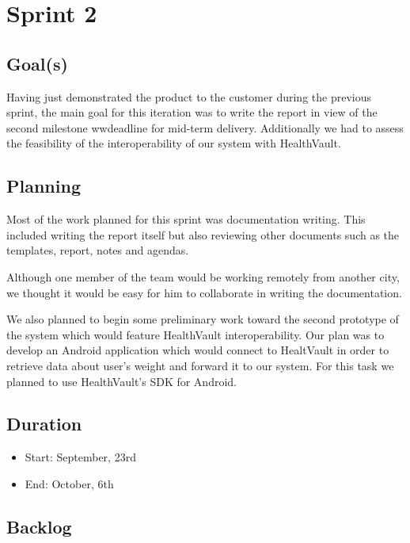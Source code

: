 

\chapter{Sprint 2}
\label{Sprint0}

\section{Goal(s)}
Having just demonstrated the product to the customer during the previous sprint, the main goal
for this iteration was to write the report in view of the second milestone wwdeadline for mid-term delivery.
Additionally we had to assess the feasibility of the interoperability of our system with HealthVault.


\section{Planning}
Most of the work planned for this sprint was documentation writing.
This included writing the report itself but also reviewing other documents such as the
templates, report, notes and agendas.

Although one member of the team would be working remotely from another city,
we thought it would be easy for him to collaborate in writing the documentation.

We also planned to begin some preliminary work toward the second prototype of the system which would
feature HealthVault interoperability. Our plan was to develop an Android application which would connect
to HealtVault in order to retrieve data about user's weight and forward it to our system. For this task
we planned to use HealthVault's SDK for Android.


\section{Duration}
\begin{itemize}
\item Start: September, 23rd
\item End: October, 6th
\end{itemize}

\section{Backlog}

